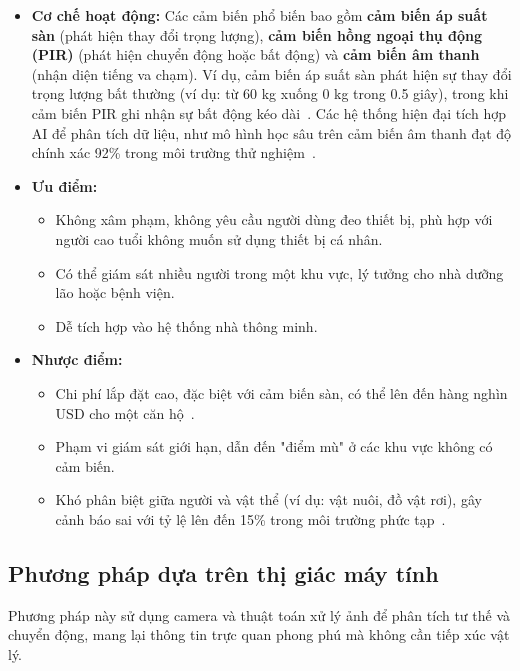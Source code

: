 \begin{itemize}
    \item \textbf{Cơ chế hoạt động:} Các cảm biến phổ biến bao gồm \textbf{cảm biến áp suất sàn} (phát hiện thay đổi trọng lượng), \textbf{cảm biến hồng ngoại thụ động (PIR)} (phát hiện chuyển động hoặc bất động) và \textbf{cảm biến âm thanh} (nhận diện tiếng va chạm). Ví dụ, cảm biến áp suất sàn phát hiện sự thay đổi trọng lượng bất thường (ví dụ: từ 60 kg xuống 0 kg trong 0.5 giây), trong khi cảm biến PIR ghi nhận sự bất động kéo dài~\cite{smartfloor2024}. Các hệ thống hiện đại tích hợp AI để phân tích dữ liệu, như mô hình học sâu trên cảm biến âm thanh đạt độ chính xác 92\% trong môi trường thử nghiệm~\cite{chen2024}. 
    \item \textbf{Ưu điểm:} 
    \begin{itemize}
        \item Không xâm phạm, không yêu cầu người dùng đeo thiết bị, phù hợp với người cao tuổi không muốn sử dụng thiết bị cá nhân.
        \item Có thể giám sát nhiều người trong một khu vực, lý tưởng cho nhà dưỡng lão hoặc bệnh viện.
        \item Dễ tích hợp vào hệ thống nhà thông minh.
    \end{itemize}
    \item \textbf{Nhược điểm:}
    \begin{itemize}
        \item Chi phí lắp đặt cao, đặc biệt với cảm biến sàn, có thể lên đến hàng nghìn USD cho một căn hộ~\cite{smartfloor2024}.
        \item Phạm vi giám sát giới hạn, dẫn đến "điểm mù" ở các khu vực không có cảm biến.
        \item Khó phân biệt giữa người và vật thể (ví dụ: vật nuôi, đồ vật rơi), gây cảnh báo sai với tỷ lệ lên đến 15\% trong môi trường phức tạp~\cite{chen2024}.
    \end{itemize}
\end{itemize}

\subsection{Phương pháp dựa trên thị giác máy tính}

Phương pháp này sử dụng camera và thuật toán xử lý ảnh để phân tích tư thế và chuyển động, mang lại thông tin trực quan phong phú mà không cần tiếp xúc vật lý.

